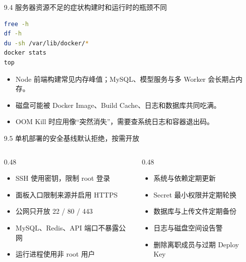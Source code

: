 \begin{frame}[fragile]{9.4 服务器资源不足的症状}{构建时和运行时的瓶颈不同}
  \begin{lstlisting}[language=bash]
free -h
df -h
du -sh /var/lib/docker/*
docker stats
top
  \end{lstlisting}
  \begin{itemize}
    \item Node 前端构建常见内存峰值；MySQL、模型服务与多 Worker 会长期占内存。
    \item 磁盘可能被 Docker Image、Build Cache、日志和数据库共同吃满。
    \item OOM Kill 时应用像“突然消失”，需要查系统日志和容器退出码。
  \end{itemize}
\end{frame}

\begin{frame}{9.5 单机部署的安全基线}{默认拒绝，按需开放}
  \begin{columns}[T]
    \begin{column}{0.48\textwidth}
      \begin{itemize}
        \item SSH 使用密钥，限制 root 登录
        \item 面板入口限制来源并启用 HTTPS
        \item 公网只开放 22 / 80 / 443
        \item MySQL、Redis、API 端口不暴露公网
        \item 运行进程使用非 root 用户
      \end{itemize}
    \end{column}
    \begin{column}{0.48\textwidth}
      \begin{itemize}
        \item 系统与依赖定期更新
        \item Secret 最小权限并定期轮换
        \item 数据库与上传文件定期备份
        \item 日志与磁盘空间设告警
        \item 删除离职成员与过期 Deploy Key
      \end{itemize}
    \end{column}
  \end{columns}
\end{frame}

